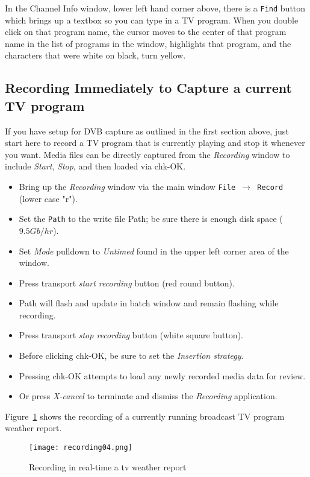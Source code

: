 In the Channel Info window, lower left hand corner above, there is a \texttt{Find} button which brings up a textbox so you can type in a TV program.  When you double click on that program name, the cursor moves to the center of that program name in the list of programs in the window, highlights that program, and the characters that were white on black, turn yellow.

\subsection{Recording Immediately to Capture a current TV program}%
\label{sub:recording_capture_current_tv_program}

If you have setup for DVB capture as outlined in the first section above, just start here to record a TV program that is currently playing and stop it whenever you want.  Media files can be directly captured from the \textit{Recording} window to include \textit{Start}, \textit{Stop}, and then loaded via chk-OK.

\begin{itemize}
    \item Bring up the \textit{Recording} window via the main window   \texttt{File $\rightarrow$ Record}   (lower case "r").
    \item Set the \texttt{Path} to the write file Path; be sure there is enough disk space ($9.5Gb/hr$).
    \item Set \textit{Mode} pulldown to \textit{Untimed} found in the upper left corner area of the window.
    \item Press transport \textit{start recording} button (red round button).
    \item Path will flash and update in batch window and remain flashing while recording.
    \item Press transport \textit{stop recording} button (white square button).
    \item Before clicking chk-OK, be sure to set the \textit{Insertion strategy}.
    \item Pressing chk-OK attempts to load any newly recorded media data for review.
    \item Or press \textit{X-cancel} to terminate and dismiss the \textit{Recording} application.
\end{itemize}

Figure~\ref{fig:recording04} shows the recording of a currently running broadcast TV program weather report.

\begin{figure}[htpb]
    \centering
    \texttt{[image: recording04.png]}
    \caption{Recording in real-time a tv weather report}
    \label{fig:recording04}
\end{figure}

